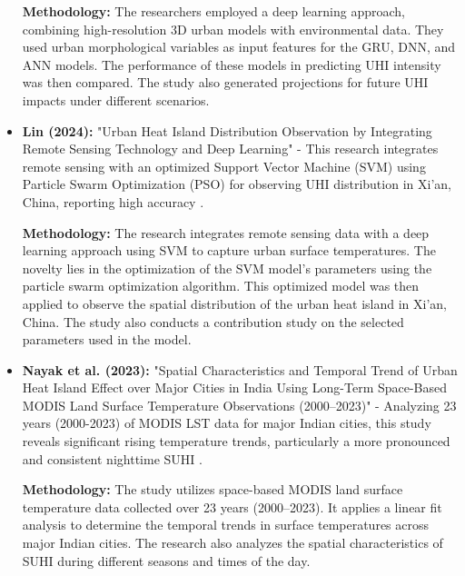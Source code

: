 \documentclass{article}
\begin{document}
\begin{itemize}
    \textbf{Methodology:} The researchers employed a deep learning approach, combining high-resolution 3D urban models with environmental data. They used urban morphological variables as input features for the GRU, DNN, and ANN models. The performance of these models in predicting UHI intensity was then compared. The study also generated projections for future UHI impacts under different scenarios.

    \vspace{0.3cm}

    \item \textbf{Lin (2024):} "{Urban Heat Island Distribution Observation by Integrating Remote Sensing Technology and Deep Learning}" - This research integrates remote sensing with an optimized Support Vector Machine (SVM) using Particle Swarm Optimization (PSO) for observing UHI distribution in Xi'an, China, reporting high accuracy \parencite{Lin_2024}.

    \textbf{Methodology:} The research integrates remote sensing data with a deep learning approach using SVM to capture urban surface temperatures. The novelty lies in the optimization of the SVM model's parameters using the particle swarm optimization algorithm. This optimized model was then applied to observe the spatial distribution of the urban heat island in Xi'an, China. The study also conducts a contribution study on the selected parameters used in the model.

    \vspace{0.3cm}

    \item \textbf{Nayak et al. (2023):} "{Spatial Characteristics and Temporal Trend of Urban Heat Island Effect over Major Cities in India Using Long-Term Space-Based MODIS Land Surface Temperature Observations (2000–2023)}" - Analyzing 23 years (2000-2023) of MODIS LST data for major Indian cities, this study reveals significant rising temperature trends, particularly a more pronounced and consistent nighttime SUHI \parencite{Nayak_2023}.

    \textbf{Methodology:} The study utilizes space-based MODIS land surface temperature data collected over 23 years (2000–2023). It applies a linear fit analysis to determine the temporal trends in surface temperatures across major Indian cities. The research also analyzes the spatial characteristics of SUHI during different seasons and times of the day.

    \vspace{0.3cm}


\end{itemize}
\end{document}
